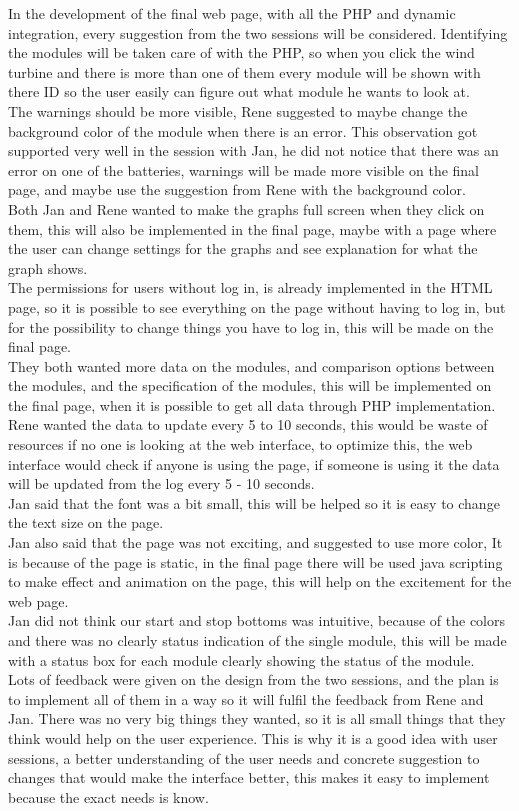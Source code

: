In the development of the final web page, with all the PHP and dynamic integration, every suggestion from the two sessions will be considered. Identifying the modules will be taken care of with the PHP, so when you click the wind turbine and there is more than one of them every module will be shown with there ID so the user easily can figure out what module he wants to look at.\\
The warnings should be more visible, Rene suggested to maybe change the background color of the module when there is an error. This observation got supported very well in the session with Jan, he did not notice that there was an error on one of the batteries, warnings will be made more visible on the final page, and maybe use the suggestion from Rene with the background color.\\
Both Jan and Rene wanted to make the graphs full screen when they click on them, this will also be implemented in the final page, maybe with a page where the user can change settings for the graphs and see explanation for what the graph shows.\\
The permissions for users without log in, is already implemented in the HTML page, so it is possible to see everything on the page without having to log in, but for the possibility to change things you have to log in, this will be made on the final page.\\
They both wanted more data on the modules, and comparison options between the modules, and the specification of the modules, this will be implemented on the final page, when it is possible to get all data through PHP implementation.\\
Rene wanted the data to update every 5 to 10 seconds, this would be waste of resources if no one is looking at the web interface, to optimize this, the web interface would check if anyone is using the page, if someone is using it the data will be updated from the log every 5 - 10 seconds.\\
Jan said that the font was a bit small, this will be helped so it is easy to change the text size on the page.\\
Jan also said that the page was not exciting, and suggested to use more color, It is because of the page is static, in the final page there will be used java scripting to make effect and animation on the page, this will help on the excitement for the web page.\\
Jan did not think our start and stop bottoms was intuitive, because of the colors and there was no clearly status indication of the single module, this will be made with a status box for each module clearly showing the status of the module.\\
Lots of feedback were given on the design from the two sessions, and the plan is to implement all of them in a way so it will fulfil the feedback from Rene and Jan. There was no very big things they wanted, so it is all small things that they think would help on the user experience. This is why it is a good idea with user sessions, a better understanding of the user needs and concrete suggestion to changes that would make the interface better, this makes it easy to implement because the exact needs is know.


